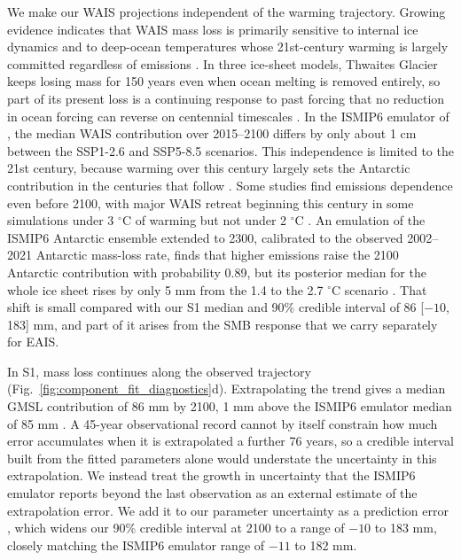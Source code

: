 \documentclass[draft,linenumbers]{agujournal2025}
\begin{document}
We make our WAIS projections independent of the warming trajectory. Growing evidence indicates that WAIS mass loss is primarily sensitive to internal ice dynamics and to deep-ocean temperatures whose 21st-century warming is largely committed regardless of emissions \citep{Naughten2023,Coulon2024,Rosier2025}. In three ice-sheet models, Thwaites Glacier keeps losing mass for 150 years even when ocean melting is removed entirely, so part of its present loss is a continuing response to past forcing that no reduction in ocean forcing can reverse on centennial timescales \citep{Williams2026}. In the ISMIP6 emulator of \citet{Edwards2021}, the median WAIS contribution over 2015--2100 differs by only about 1 cm between the SSP1-2.6 and SSP5-8.5 scenarios. This independence is limited to the 21st century, because warming over this century largely sets the Antarctic contribution in the centuries that follow \citep{Lowry2021,Seroussi2024}. Some studies find emissions dependence even before 2100, with major WAIS retreat beginning this century in some simulations under 3 $^\circ$C of warming but not under 2 $^\circ$C \citep{DeConto2021}. An emulation of the ISMIP6 Antarctic ensemble extended to 2300, calibrated to the observed 2002--2021 Antarctic mass-loss rate, finds that higher emissions raise the 2100 Antarctic contribution with probability 0.89, but its posterior median for the whole ice sheet rises by only 5 mm from the 1.4 to the 2.7 $^\circ$C scenario \citep{Lin2026}. That shift is small compared with our S1 median and 90\% credible interval of 86 [$-10$, 183] mm, and part of it arises from the SMB response that we carry separately for EAIS.

In S1, mass loss continues along the observed trajectory (Fig.~\ref{fig:component_fit_diagnostics}d). Extrapolating the trend gives a median GMSL contribution of 86 mm by 2100, 1 mm above the ISMIP6 emulator median of 85 mm \citep{Edwards2021}. A 45-year observational record cannot by itself constrain how much error accumulates when it is extrapolated a further 76 years, so a credible interval built from the fitted parameters alone would understate the uncertainty in this extrapolation. We instead treat the growth in uncertainty that the ISMIP6 emulator reports beyond the last observation as an external estimate of the extrapolation error. We add it to our parameter uncertainty as a prediction error \citep{Tarantola2005}, which widens our 90\% credible interval at 2100 to a range of $-10$ to 183 mm, closely matching the ISMIP6 emulator range of $-11$ to 182 mm.
\end{document}
